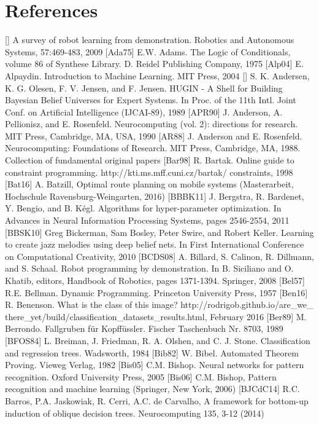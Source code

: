 \documentclass[10pt]{book}
\begin{document}
\section{References}
[\cite{survey2009robotlfd}] A survey of robot learning from demonstration. Robotics and Autonomous Systems, 57:469-483, 2009
[Ada75] E.W. Adams. The Logic of Conditionals, volume 86 of Synthese Library. D. Reidel Publishing Company, 1975
[Alp04] E. Alpaydin. Introduction to Machine Learning. MIT Press, 2004
[\cite{andersen1989hugin}] S. K. Andersen, K. G. Olesen, F. V. Jensen, and F. Jensen. HUGIN - A Shell for Building Bayesian Belief Universes for Expert Systems. In Proc. of the 11th Intl. Joint Conf. on Artificial Intelligence (IJCAI-89), 1989
[APR90] J. Anderson, A. Pellionisz, and E. Rosenfeld. Neurocomputing (vol. 2): directions for research. MIT Press, Cambridge, MA, USA, 1990
[AR88] J. Anderson and E. Rosenfeld. Neurocomputing: Foundations of Research. MIT Press, Cambridge, MA, 1988. Collection of fundamental original papers
[Bar98] R. Bartak. Online guide to constraint programming. http://kti.ms.mff.cuni.cz/bartak/ constraints, 1998
[Bat16] A. Batzill, Optimal route planning on mobile systems (Masterarbeit, Hochschule Ravensburg-Weingarten, 2016)
[BBBK11] J. Bergstra, R. Bardenet, Y. Bengio, and B. Kégl. Algorithms for hyper-parameter optimization. In Advances in Neural Information Processing Systems, pages 2546-2554, 2011
[BBSK10] Greg Bickerman, Sam Bosley, Peter Swire, and Robert Keller. Learning to create jazz melodies using deep belief nets. In First International Conference on Computational Creativity, 2010
[BCDS08] A. Billard, S. Calinon, R. Dillmann, and S. Schaal. Robot programming by demonstration. In B. Siciliano and O. Khatib, editors, Handbook of Robotics, pages 1371-1394. Springer, 2008
[Bel57] R.E. Bellman. Dynamic Programming. Princeton University Press, 1957
[Ben16] R. Benenson. What is the class of this image? http://rodrigob.github.io/are_we_ there_yet/build/classification_datasets_results.html, February 2016
[Ber89] M. Berrondo. Fallgruben für Kopffüssler. Fischer Taschenbuch Nr. 8703, 1989
[BFOS84] L. Breiman, J. Friedman, R. A. Olshen, and C. J. Stone. Classification and regression trees. Wadsworth, 1984
[Bib82] W. Bibel. Automated Theorem Proving. Vieweg Verlag, 1982
[Bis05] C.M. Bishop. Neural networks for pattern recognition. Oxford University Press, 2005
[Bis06] C.M. Bishop, Pattern recognition and machine learning (Springer, New York, 2006)
[BJCdC14] R.C. Barros, P.A. Jaskowiak, R. Cerri, A.C. de Carvalho, A framework for bottom-up induction of oblique decision trees. Neurocomputing 135, 3-12 (2014)
\end{document}
